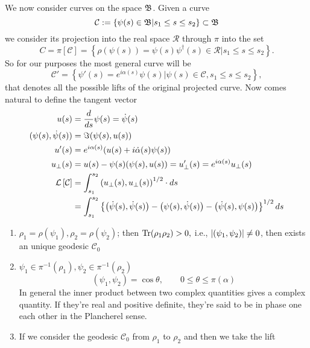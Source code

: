 We now consider curves on the space $ \mathfrak{B} $. Given a curve 
\begin{equation}
\mathcal{C}:=\left\{\psi(s)\in\mathfrak{B} |s_1\leq s\leq s_2 \right\}\subset \mathfrak{B}
\end{equation}
we consider its projection into the real space $ \mathcal{R} $ through $ \pi $ into the set 
\begin{equation}
C=\pi\left[\mathcal{C}\right]=\left\{\rho(\psi(s))=\psi(s)\psi^{\dagger}(s)\in\mathcal{R}|s_1\leq s\leq s_2 \right\}.
\end{equation}
So for our purposes the most general curve will be 
\begin{equation}
\mathcal{C}'=\left\{\psi'(s)=e^{i\alpha(s)}\psi(s)|\psi(s)\in\mathcal{C}, s_1\leq s\leq s_2 \right\},
\end{equation}
that denotes all the possible lifts of the original projected curve. Now comes natural to define the tangent vector 
\begin{align}
	u(s)&=\dfrac{d}{ds}\psi(s)=\dot{\psi}(s)\\
	(\psi(s),\dot{\psi}(s))&=\Im(\psi(s),u(s))\\
	u'(s)&=e^{i\alpha(s)}(u(s)+i\dot{\alpha}(s)\psi(s))\\
	u_{\perp}(s)&=u(s)-\psi(s)(\psi(s),u(s))=u_{\perp}'(s)=e^{i\alpha(s)}u_{\perp}(s)\\
	\mathcal{L}\left[\mathcal{C}\right]&=\int_{s_1}^{s_2}\left(u_{\perp}(s),u_{\perp}(s)\right)^{1/2}\cdot\mathop{}\!d s \\
	&=\int_{s_1}^{s_2}\left\{\left(\dot{\psi}(s),\dot{\psi}(s)\right)-\left(\psi(s),\dot{\psi}(s)\right)-\left(\dot{\psi}(s),\psi(s)\right) \right\}^{1/2} \mathop{}\!d s
\end{align}

\begin{enumerate}[i]
	\item $ \rho_1=\rho(\psi_1),\rho_2=\rho(\psi_2) $; then $ \mathrm{Tr}(\rho_1\rho_2)>0, $ i.e., $ \lvert\left(\psi_1,\psi_2\right)\rvert\neq 0 $, then exists an unique geodesic $ \mathcal{C}_0 $
	\item $ \psi_1\in\pi^{-1}(\rho_1), \psi_2\in\pi^{-1}(\rho_2) $
	\begin{equation}
	\left(\psi_1,\psi_2 \right)=\cos\theta, \qquad 0\leq \theta\leq\pi(\alpha)
	\end{equation}
	In general the inner product between two complex quantities gives a complex quantity. If they're real and positive definite, they're said to be in phase one each other in the Plancherel sense.
	\item If we consider the geodesic $ \mathcal{C}_0 $ from $ \rho_1 $ to $ \rho_2 $ and then we take the lift
\end{enumerate}